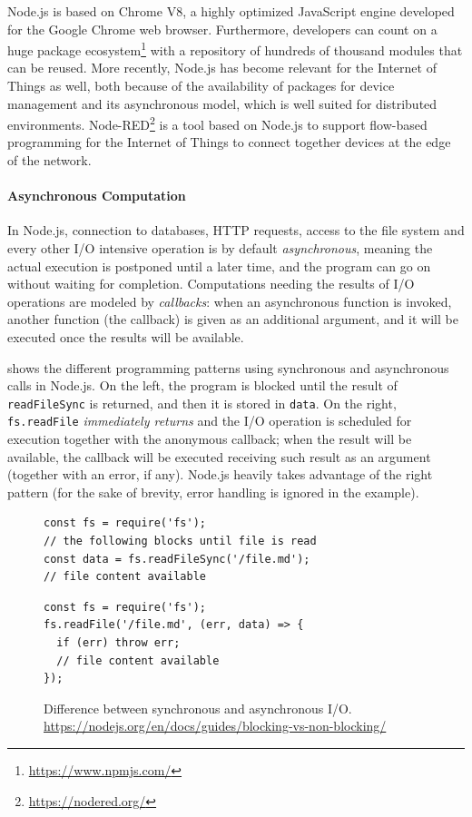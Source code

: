 Node.js is based on Chrome V8, a highly optimized JavaScript engine developed for the Google Chrome web browser. 
Furthermore, developers can count on a huge package ecosystem\footnote{\url{https://www.npmjs.com/}} with a repository of hundreds of thousand modules that can be reused.
More recently, Node.js has become relevant for the Internet of Things as well, both because of the availability of packages for device management and its asynchronous model, which is well suited for distributed environments.
Node-RED\footnote{\url{https://nodered.org/}} is a tool based on Node.js to support flow-based programming for the Internet of Things to
connect together devices at the edge of the network.

\paragraph{Asynchronous Computation}
In Node.js, connection to databases, HTTP requests, access to the file system and every other I/O intensive operation is by default \emph{asynchronous}, meaning the actual execution is postponed until a later time, and the program can go on without waiting for completion.
Computations needing the results of I/O operations are modeled by \emph{callbacks}: when an asynchronous function is invoked, another function (the callback) is given as an additional argument, and it will be executed once the results will be available.

 shows the different programming patterns using synchronous and asynchronous calls in Node.js.
On the left, the program is blocked until the result of \lstinline{readFileSync} is returned, and then it is stored in \lstinline{data}.
On the right, \lstinline{fs.readFile} \emph{immediately returns} and the I/O operation is scheduled for execution together with the anonymous callback; when the result will be available, the callback will be executed receiving such result as an argument (together with an error, if any).
Node.js heavily takes advantage of the right pattern (for the sake of brevity, error handling is ignored in the example).

\begin{figure}[h]
\begin{minipage}{.5\textwidth}
\begin{lstlisting}
const fs = require('fs');
// the following blocks until file is read
const data = fs.readFileSync('/file.md');
// file content available
\end{lstlisting}
\end{minipage}
\begin{minipage}{.5\textwidth}
\begin{lstlisting}
const fs = require('fs');
fs.readFile('/file.md', (err, data) => {
  if (err) throw err;
  // file content available
});
\end{lstlisting}
\end{minipage}
\caption{Difference between synchronous and asynchronous I/O. \url{https://nodejs.org/en/docs/guides/blocking-vs-non-blocking/}}
\label{lst:async}
\end{figure}


